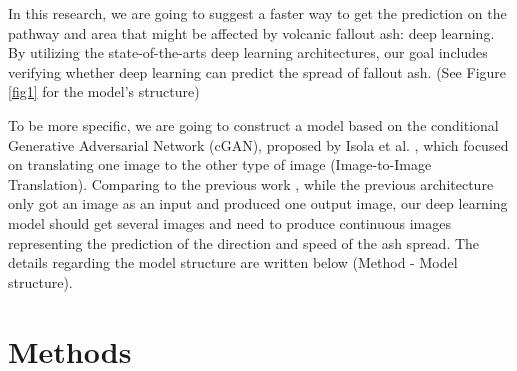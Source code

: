 \documentclass{article}
\begin{document}
\begin{doublespacing}
{  In this research, we are going to suggest a faster way to get the prediction on the pathway and 
  area that might be affected by volcanic fallout ash: deep learning. By utilizing the
  state-of-the-arts deep learning architectures, our goal includes verifying whether deep learning 
  can predict the spread of fallout ash. (See Figure \ref{fig1} for the model's structure)

  \fontsize{10pt}{10.5pt} 

  To be more specific, we are going to construct a model based on the conditional Generative 
  Adversarial Network (cGAN), proposed by Isola et al. \cite{isola2016imagetoimage}, which focused 
  on translating one image to the other type of image (Image-to-Image Translation). Comparing to the 
  previous work \cite{isola2016imagetoimage}, while the previous architecture only got an image as 
  an input and produced one output image, our deep learning model should get several images and need
  to produce continuous images representing the prediction of the direction and speed of the ash 
  spread. The details regarding the model structure are written below (Method - Model structure).
}

\section{Methods}  %
\fontsize{11pt}{11pt} \selectfont {
}
\end{doublespacing}
\end{document}
